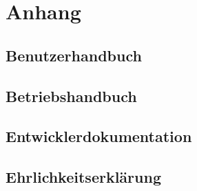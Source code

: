 
\renewcommand\refname{Literaturverzeichnis}
\printbibliography
\cleardoublepage
\listoffigures

\section{Anhang}
    \subsection{Benutzerhandbuch}
    \subsection{Betriebshandbuch}
    \subsection{Entwicklerdokumentation}
    \subsection{Ehrlichkeitserklärung}